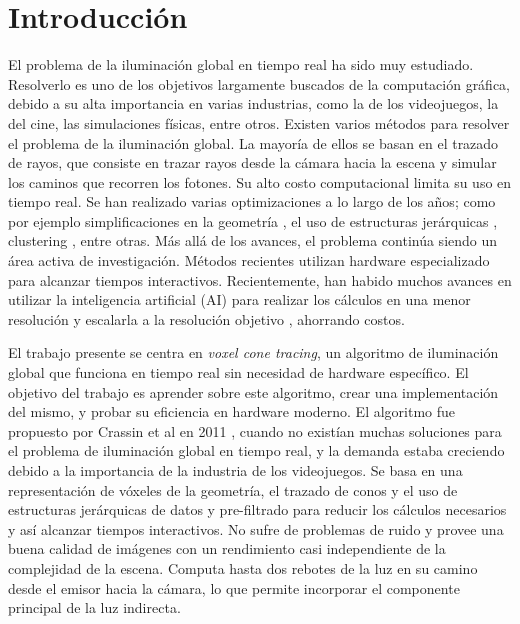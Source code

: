 \chapter{Introducción}


El problema de la iluminación global en tiempo real ha sido muy estudiado.
Resolverlo es uno de los objetivos largamente buscados de la computación gráfica, debido a su alta importancia en varias industrias, como la de los videojuegos, la del cine, las simulaciones físicas, entre otros.
Existen varios métodos para resolver el problema de la iluminación global.
La mayoría de ellos se basan en el trazado de rayos, que consiste en trazar rayos desde la cámara hacia la escena y simular los caminos que recorren los fotones.
Su alto costo computacional limita su uso en tiempo real.
Se han realizado varias optimizaciones a lo largo de los años; como por ejemplo simplificaciones en la geometría \cite{gigavoxels}, el uso de estructuras jerárquicas \cite{real-time-photon-mapping}, clustering \cite{faster-photon-mapping}, entre otras.
Más allá de los avances, el problema continúa siendo un área activa de investigación.
Métodos recientes utilizan hardware especializado para alcanzar tiempos interactivos.
Recientemente, han habido muchos avances en utilizar la inteligencia artificial (AI) para realizar los cálculos en una menor resolución y escalarla a la resolución objetivo \cite{image-super-resolution-survey}, ahorrando costos.

El trabajo presente se centra en \textit{voxel cone tracing}, un algoritmo de iluminación global que funciona en tiempo real sin necesidad de hardware específico.
El objetivo del trabajo es aprender sobre este algoritmo, crear una implementación del mismo, y probar su eficiencia en hardware moderno.
El algoritmo fue propuesto por Crassin et al en 2011 \cite{voxel-cone-tracing}, cuando no existían muchas soluciones para el problema de iluminación global en tiempo real, y la demanda estaba creciendo debido a la importancia de la industria de los videojuegos.
Se basa en una representación de vóxeles de la geometría, el trazado de conos y el uso de estructuras jerárquicas de datos y pre-filtrado para reducir los cálculos necesarios y así alcanzar tiempos interactivos.
No sufre de problemas de ruido y provee una buena calidad de imágenes con un rendimiento casi independiente de la complejidad de la escena.
Computa hasta dos rebotes de la luz en su camino desde el emisor hacia la cámara, lo que permite incorporar el componente principal de la luz indirecta.

